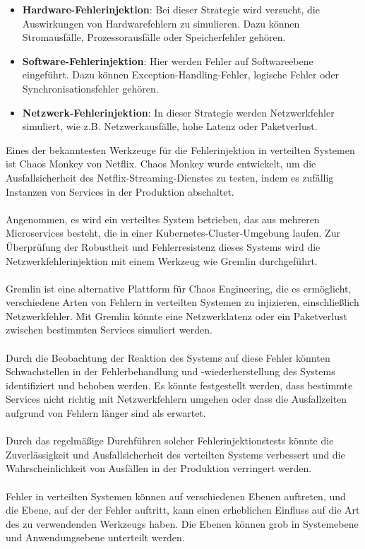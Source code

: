 \begin{itemize}
\item \textbf{Hardware-Fehlerinjektion}: Bei dieser Strategie wird versucht, die Auswirkungen von Hardwarefehlern zu simulieren. Dazu können Stromausfälle, Prozessorausfälle oder Speicherfehler gehören.
\item \textbf{Software-Fehlerinjektion}: Hier werden Fehler auf Softwareebene eingeführt. Dazu können Exception-Handling-Fehler, logische Fehler oder Synchronisationsfehler gehören.
\item \textbf{Netzwerk-Fehlerinjektion}: In dieser Strategie werden Netzwerkfehler simuliert, wie z.B. Netzwerkausfälle, hohe Latenz oder Paketverlust.
\end{itemize}
Eines der bekanntesten Werkzeuge für die Fehlerinjektion in verteilten Systemen ist Chaos Monkey von Netflix. Chaos Monkey wurde entwickelt, um die Ausfallsicherheit des Netflix-Streaming-Dienstes zu testen, indem es zufällig Instanzen von Services in der Produktion abschaltet.
\\\\
Angenommen, es wird ein verteiltes System betrieben, das aus mehreren Microservices besteht, die in einer Kubernetes-Cluster-Umgebung laufen. Zur Überprüfung der Robustheit und Fehlerresistenz dieses Systems wird die Netzwerkfehlerinjektion mit einem Werkzeug wie Gremlin durchgeführt.
\\\\
Gremlin ist eine alternative Plattform für Chaos Engineering, die es ermöglicht, verschiedene Arten von Fehlern in verteilten Systemen zu injizieren, einschließlich Netzwerkfehler. Mit Gremlin könnte eine Netzwerklatenz oder ein Paketverlust zwischen bestimmten Services simuliert werden.
\\\\
Durch die Beobachtung der Reaktion des Systems auf diese Fehler könnten Schwachstellen in der Fehlerbehandlung und -wiederherstellung des Systems identifiziert und behoben werden. Es könnte festgestellt werden, dass bestimmte Services nicht richtig mit Netzwerkfehlern umgehen oder dass die Ausfallzeiten aufgrund von Fehlern länger sind als erwartet.
\\\\
Durch das regelmäßige Durchführen solcher Fehlerinjektionstests könnte die Zuverlässigkeit und Ausfallsicherheit des verteilten Systems verbessert und die Wahrscheinlichkeit von Ausfällen in der Produktion verringert werden.
\\\\
Fehler in verteilten Systemen können auf verschiedenen Ebenen auftreten, und die Ebene, auf der der Fehler auftritt, kann einen erheblichen Einfluss auf die Art des zu verwendenden Werkzeugs haben. Die Ebenen können grob in Systemebene und Anwendungsebene unterteilt werden.

